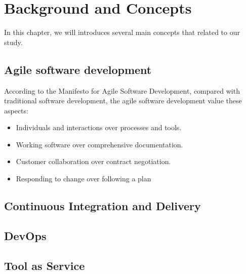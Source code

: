 \chapter{Background and Concepts}
In this chapter, we will introduces several main concepts that related to our study.
\section{Agile software development}
According to the  Manifesto for Agile Software Development, compared with traditional software development, the agile software development value these aspects: \cite{beck2001manifesto}
\begin{itemize}
\item Individuals and interactions over processes and tools.
\item Working software over comprehensive documentation.
\item Customer collaboration over contract negotiation.
\item Responding to change over following a plan
\end{itemize}
\section{Continuous Integration and Delivery}
\section{DevOps}
\section{Tool as Service}
